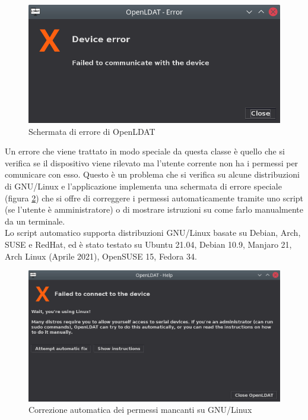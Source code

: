 \begin{figure}[H]
	\centering
	\includegraphics[width=.8\textwidth]{Applicazione_files/gui_errordialog.png}
	\caption{Schermata di errore di OpenLDAT}
	\label{fig:gui_errordialog}
\end{figure}

Un errore che viene trattato in modo speciale da questa classe è quello che si verifica se il dispositivo viene rilevato ma l'utente corrente non ha i permessi per comunicare con esso. Questo è un problema che si verifica su alcune distribuzioni di GNU/Linux e l'applicazione implementa una schermata di errore speciale (figura \ref{fig:gui_linuxerror}) che si offre di correggere i permessi automaticamente tramite uno script (se l'utente è amministratore) o di mostrare istruzioni su come farlo manualmente da un terminale.\\
Lo script automatico supporta distribuzioni GNU/Linux basate su Debian, Arch, SUSE e RedHat, ed è stato testato su Ubuntu 21.04, Debian 10.9, Manjaro 21, Arch Linux (Aprile 2021), OpenSUSE 15, Fedora 34.

\begin{figure}[H]
	\centering
	\includegraphics[width=\textwidth]{Applicazione_files/gui_linuxerror.png}
	\caption{Correzione automatica dei permessi mancanti su GNU/Linux}
	\label{fig:gui_linuxerror}
\end{figure}

